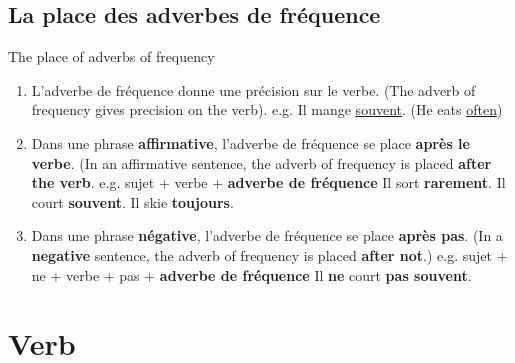 \documentclass[10pt,a4paper,twoside]{article} %
\begin{document}
\subsection*{La place des adverbes de fréquence}
\begin{center}
    The place of adverbs of frequency
\end{center}
\begin{enumerate}
    \item L'adverbe de fréquence donne une précision sur le verbe. (The adverb of frequency gives precision on the verb). \newline
    e.g. Il mange \underline{souvent}. (He eats \underline{often})
    \item Dans une phrase \textbf{affirmative}, l'adverbe de fréquence se place \textbf{après le verbe}. (In an affirmative sentence, the adverb of frequency is placed \textbf{after the verb}. \newline
    e.g. sujet + verbe + \textbf{adverbe de fréquence} \newline
    Il sort \textbf{rarement}. Il court \textbf{souvent}. Il skie \textbf{toujours}.
    \item Dans une phrase \textbf{négative}, l'adverbe de fréquence se place \textbf{après pas}. (In a \textbf{negative} sentence, the adverb of frequency is placed \textbf{after not}.) \newline
    e.g. sujet + ne + verbe + pas + \textbf{adverbe de fréquence} \newline
    Il \textbf{ne} court \textbf{pas souvent}.
\end{enumerate}

\section*{Verb}
\end{document}
